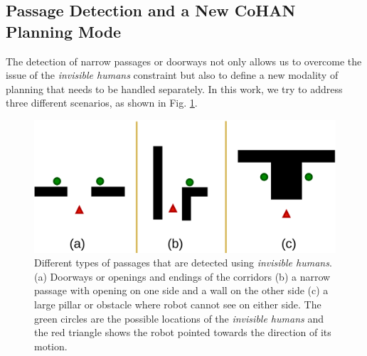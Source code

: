 \subsection{Passage Detection and a New CoHAN Planning Mode}\label{psg_detect}
The detection of narrow passages or doorways not only allows us to overcome the issue of the \textit{invisible humans} constraint but also to define a new modality of planning that needs to be handled separately. In this work, we try to address three different scenarios, as shown in Fig. \ref{fig:passages}.  
\begin{figure}[h]
    \centering
    \includegraphics[width=0.8\columnwidth]{images/chapter5/passages.png}
    \caption{Different types of passages that are detected using \textit{invisible humans}. (a) Doorways or openings and endings of the corridors (b) a narrow passage with opening on one side and a wall on the other side (c) a large pillar or obstacle where robot cannot see on either side. The green circles are the possible locations of the \textit{invisible humans} and the red triangle shows the robot pointed towards the direction of its motion.}
    \label{fig:passages}
\end{figure}
